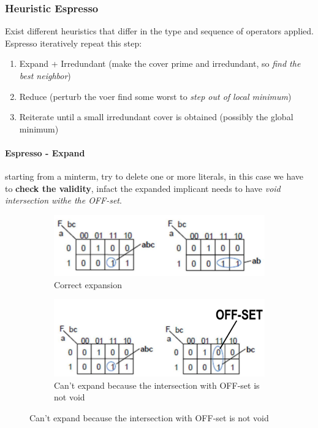 \subsubsection{Heuristic Espresso}

Exist different heuristics that differ in the type and sequence of operators applied. Espresso iteratively repeat this step:

\begin{enumerate}
	\item Expand + Irredundant (make the cover prime and irredundant, so \textit{find the best neighbor})
	\item Reduce (perturb the voer find some worst to \textit{step out of local minimum})  
	\item Reiterate until a small irredundant cover is obtained (possibly the global minimum)
\end{enumerate}

\paragraph{Espresso - Expand} starting from a minterm, try to delete one or more literals, in this case we have to \textbf{check the validity}, infact the expanded implicant needs to have \textit{void intersection withe the OFF-set}.

\begin{figure}[H]
	\centering
	\begin{subfigure}[b]{0.45\textwidth}
		\includegraphics[width=\textwidth]{./Cap6/Images/Image8.png}
		\caption{Correct expansion}
		\label{fig:goodexpand}
	\end{subfigure}
	\quad
	\begin{subfigure}[b]{0.45\textwidth}
		\includegraphics[width=\textwidth]{./Cap6/Images/Image9.png}
		\caption{Can't expand because the intersection with OFF-set is not void}
		\label{fig:badexpand}
	\end{subfigure}
\end{figure}

